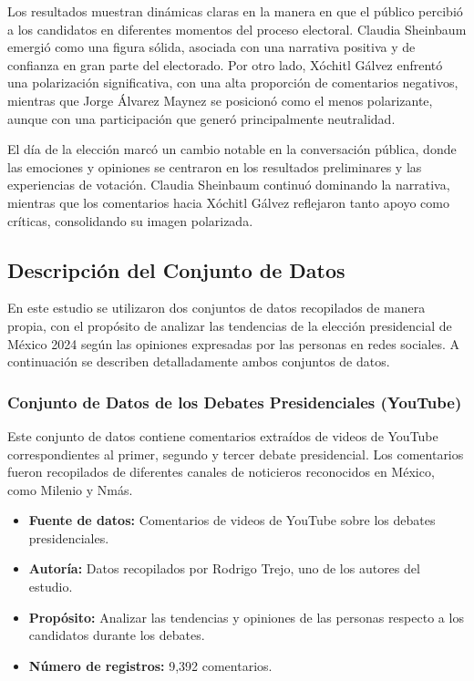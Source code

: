 \documentclass[10pt, a4paper]{article}
\begin{document}
	Los resultados muestran dinámicas claras en la manera en que el público percibió a los candidatos en diferentes momentos del proceso electoral. Claudia Sheinbaum emergió como una figura sólida, asociada con una narrativa positiva y de confianza en gran parte del electorado. Por otro lado, Xóchitl Gálvez enfrentó una polarización significativa, con una alta proporción de comentarios negativos, mientras que Jorge Álvarez Maynez se posicionó como el menos polarizante, aunque con una participación que generó principalmente neutralidad.
	
	El día de la elección marcó un cambio notable en la conversación pública, donde las emociones y opiniones se centraron en los resultados preliminares y las experiencias de votación. Claudia Sheinbaum continuó dominando la narrativa, mientras que los comentarios hacia Xóchitl Gálvez reflejaron tanto apoyo como críticas, consolidando su imagen polarizada.
	
	
	\subsection{Descripción del Conjunto de Datos}
	
	En este estudio se utilizaron dos conjuntos de datos recopilados de manera propia, con el propósito de analizar las tendencias de la elección presidencial de México 2024 según las opiniones expresadas por las personas en redes sociales. A continuación se describen detalladamente ambos conjuntos de datos.
	
	\subsubsection{Conjunto de Datos de los Debates Presidenciales (YouTube)}
	
	Este conjunto de datos contiene comentarios extraídos de videos de YouTube correspondientes al primer, segundo y tercer debate presidencial. Los comentarios fueron recopilados de diferentes canales de noticieros reconocidos en México, como Milenio y Nmás.
	
	\begin{itemize}
		\item \textbf{Fuente de datos:} Comentarios de videos de YouTube sobre los debates presidenciales.
		\item \textbf{Autoría:} Datos recopilados por Rodrigo Trejo, uno de los autores del estudio.
		\item \textbf{Propósito:} Analizar las tendencias y opiniones de las personas respecto a los candidatos durante los debates.
		\item \textbf{Número de registros:} 9,392 comentarios.
	\end{itemize}
	
\end{document}
